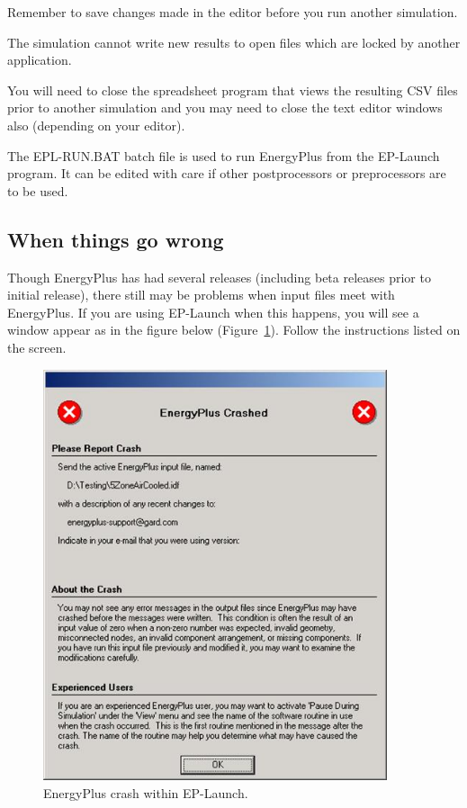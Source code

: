 Remember to save changes made in the editor before you run another simulation.

The simulation cannot write new results to open files which are locked by another application.

You will need to close the spreadsheet program that views the resulting CSV files prior to another simulation and you may need to close the text editor windows also (depending on your editor).

The EPL-RUN.BAT batch file is used to run EnergyPlus from the EP-Launch program. It can be edited with care if other postprocessors or preprocessors are to be used.

\subsection{When things go wrong}\label{when-things-go-wrong}

Though EnergyPlus has had several releases (including beta releases prior to initial release), there still may be problems when input files meet with EnergyPlus. If you are using EP-Launch when this happens, you will see a window appear as in the figure below (Figure~\ref{fig:energyplus-crash-within-ep-launch.}). Follow the instructions listed on the screen.

\begin{figure}[hbtp] %
\centering
\includegraphics[width=0.9\textwidth, height=0.9\textheight, keepaspectratio=true]{media/image010.jpg}
\caption{EnergyPlus crash within EP-Launch. \protect \label{fig:energyplus-crash-within-ep-launch.}}
\end{figure}

